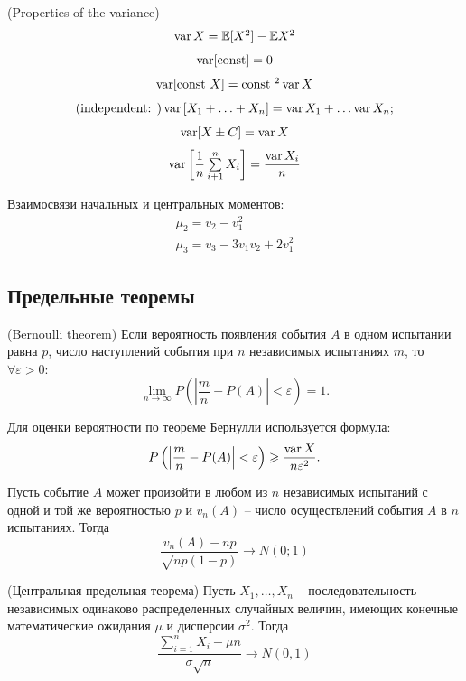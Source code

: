 \begin{theorema}{(Properties of the variance)}{}
    \[
        \begin{array}{c}
            \operatorname{var} X = \mathbb{E}[X^2] - \mathbb{E} X^2\\[0.25cm]
            \operatorname{var} [\text{const}] = 0\\[0.25cm]
            \operatorname{var} [\text{const } X] = \text{const }^2 \operatorname{var} X\\[0.25cm]
            (\text{independent: }) \operatorname{var} \left[X_1 + \ldots + X_n\right] = \operatorname{var} X_1 + \ldots \operatorname{var} X_n;\\[0.25cm]
            \operatorname{var} [X \pm C] = \operatorname{var} X\\[0.25cm]
            \operatorname{var} \left[\dfrac{1}{n}\sum\limits_{i+1}^n X_i\right] = \dfrac{\operatorname{var} X_i}{n} 
        \end{array}  
    \]
\end{theorema}
Взаимосвязи начальных и центральных моментов:
\[
    \begin{array}{c}
        \mu_2 = v_2 - v_1^2\\
        \mu_3 = v_3 - 3v_1 v_2 + 2v_1^2
    \end{array}
\]

\subsection*{Предельные теоремы}
\begin{theorema}{(Bernoulli theorem)}{}
    Если вероятность появления события $A$ в одном испытании равна $p$, число наступлений события при $n$ независимых испытаниях $m$, то $\forall \varepsilon > 0$:
    \[
        \lim\limits_{n\to \infty} P\left(\left|\dfrac{m}{n} - P(A)\right| < \varepsilon\right) = 1. 
    \]
\end{theorema}
\begin{note}{}{}
    Для оценки вероятности по теореме Бернулли используется формула:
    \[
        P\left(\left| \dfrac{m}{n} - P(A) \right|< \varepsilon \right) \geqslant \dfrac{\operatorname{var} X}{n\varepsilon^2}.  
    \]
\end{note}

\begin{theorema}{}{}
    Пусть событие $A$ может произойти в любом из $n$ независимых испытаний с одной и той же вероятностью $p$ и $v_n(A)$ -- число осуществлений события $A$ в $n$ испытаниях. Тогда 
    \[
        \dfrac{v_n(A) - np}{\sqrt{np(1-p)}} \to N(0;1)
    \]
\end{theorema}

\begin{theorema}{(Центральная предельная теорема)}{}
    Пусть $X_1, \ldots, X_n$ -- последовательность независимых одинаково распределенных случайных величин, имеющих конечные математические ожидания $\mu$ и дисперсии $\sigma^2.$ Тогда 
    \[
        \dfrac{\sum\limits_{i=1}^n X_i - \mu n}{\sigma \sqrt{n}} \to N(0,1)  
    \]
\end{theorema}

